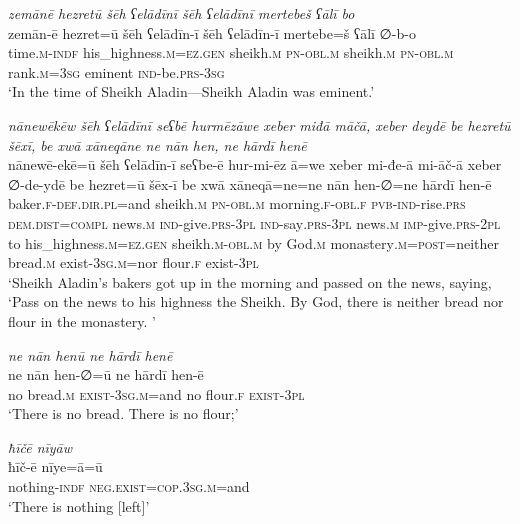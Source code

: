 \ea \label{HB.1}
\textit{zemānē hezretū šēh ʕelādīnī šēh ʕelādīnī mertebeš ʕālī bo} \\ 
\gll zemān-ē hezret=ū šēh ʕelādīn-ī šēh ʕelādīn-ī mertebe=š ʕālī ∅-b-o \\ 
 time\textsc{.m}\textsc{-indf} his\_highness\textsc{.m}\textsc{=ez}\textsc{.gen} sheikh\textsc{.m} \textsc{pn}\textsc{-obl}\textsc{.m} sheikh\textsc{.m} \textsc{pn}\textsc{-obl}\textsc{.m} rank\textsc{.m}\textsc{=3sg} eminent \textsc{ind-}be\textsc{.prs}\textsc{-3sg} \\ 
\glt `In the time of Sheikh Aladin—Sheikh Aladin was eminent.'
\z 
 
\ea \label{HB.2}
\textit{nānewēkēw šēh ʕelādīnī seʕbē hurmēzāwe xeber miđā māčā, xeber deydē be hezretū šēxī, be xwā xāneqāne ne nān hen, ne hārdī henē} \\ 
\gll nānewē-ekē=ū šēh ʕelādīn-ī seʕbe-ē hur-mi-ēz ā=we xeber mi-đe-ā mi-āč-ā xeber ∅-de-ydē be hezret=ū šēx-ī be xwā xāneqā=ne=ne nān hen-∅=ne hārdī hen-ē \\ 
 baker\textsc{\textsc{.f}}\textsc{-def}\textsc{.dir}\textsc{.pl}=and sheikh\textsc{.m} \textsc{pn}\textsc{-obl}\textsc{.m} morning\textsc{\textsc{.f}}\textsc{-obl}\textsc{\textsc{.f}} \textsc{pvb-}\textsc{ind-}rise\textsc{.prs} \textsc{dem.dist}\textsc{=compl} news\textsc{.m} \textsc{ind-}give\textsc{.prs}\textsc{-3pl} \textsc{ind-}say\textsc{.prs}\textsc{-3pl} news\textsc{.m} \textsc{imp-}give\textsc{.prs}\textsc{-2pl} to his\_highness\textsc{.m}\textsc{=ez}\textsc{.gen} sheikh\textsc{.m}\textsc{-obl}\textsc{.m} by God\textsc{.m} monastery\textsc{.m}\textsc{=\textsc{post}}=neither bread\textsc{.m} exist\textsc{-3sg}\textsc{.m}=nor flour\textsc{\textsc{.f}} exist\textsc{-3pl} \\ 
\glt `Sheikh Aladin’s bakers got up in the morning and passed on the news, saying, ‘Pass on the news to his highness the Sheikh. By God, there is neither bread nor flour in the monastery. '
\z 
 
\ea \label{HB.3}
\textit{ne nān henū ne hārdī henē} \\ 
\gll ne nān hen-∅=ū ne hārdī hen-ē \\ 
 no bread\textsc{.m} \textsc{exist}\textsc{-3sg}\textsc{.m}=and no flour\textsc{\textsc{.f}} \textsc{exist}\textsc{-3pl} \\ 
\glt `There is no bread. There is no flour;'
\z 
 
\ea \label{HB.4}
\textit{ħīčē nīyāw} \\ 
\gll ħīč-ē nīye=ā=ū \\ 
 nothing\textsc{-indf} \textsc{\textsc{neg.}exist}\textsc{=cop}\textsc{.3sg}\textsc{.m}=and \\ 
\glt `There is nothing [left]'
\z 
 
